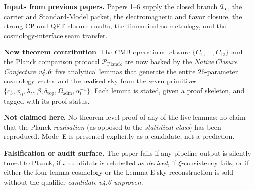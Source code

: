 \documentclass[11pt,a4paper]{article}
\begin{document}
\begin{tfptfrontbox}
\textbf{Inputs from previous papers.} Papers 1--6 supply the closed
branch \(\mathfrak T_{\star}\), the carrier and Standard-Model packet, the
electromagnetic and flavor closure, the strong-CP and QFT-closure
results, the dimensionless metrology, and the cosmology-interface seam
transfer.

\textbf{New theorem contribution.} The CMB operational closure
\(\{C_1,\dots,C_{12}\}\) and the Planck comparison protocol
\(\mathcal P_{\mathrm{Planck}}\) are now backed by the
\emph{Native\,Closure\,Conjecture v4.6}: five analytical lemmas that
generate the entire 26-parameter cosmology vector and the realised
sky from the seven primitives
\(\{c_3,\phi_0,\lambda_C,\beta,\delta_{\mathrm{top}},
\Omega_{\mathrm{adm}},\alpha_0^{-1}\}\).  Each lemma is stated, given a
proof skeleton, and tagged with its proof status.

\textbf{Not claimed here.} No theorem-level proof of any of the five
lemmas; no claim that the Planck \emph{realisation} (as opposed to the
\emph{statistical class}) has been reproduced.  Mode~E is presented
explicitly as a candidate, not a prediction.

\textbf{Falsification or audit surface.} The paper fails if any
pipeline output is silently tuned to Planck, if a candidate is
relabelled as \emph{derived}, if \(\xi\)-consistency fails, or if
either the four-lemma cosmology or the Lemma-E sky reconstruction is
sold without the qualifier \emph{candidate v4.6 unproven}.
\end{tfptfrontbox}
\end{document}
